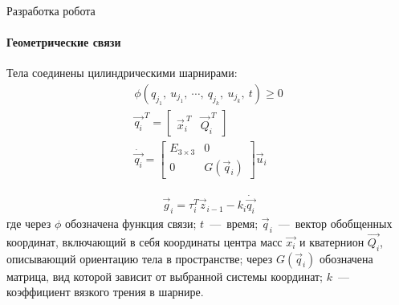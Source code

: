 \documentclass[aspectratio=169,xcolor=table,10pt]{beamer}
\begin{document}
\begin{frame}[t]{Разработка робота}
    \framesubtitle{Геометрические связи}
    \vspace{-0.5cm}
    Тела соединены цилиндрическими шарнирами:
    \begin{align*}
        \label{eq:kin_constr}
        \phi(q_{j_1},\ u_{j_1},\ \cdots,\ q_{j_k},\ u_{j_k},\ t) \geqslant  0 \\
        \vec{q_i}^{\ T} = \begin{bmatrix}
                              \vec{x}_i^{\ T} & \vec{Q}_i^{\ T}
                          \end{bmatrix}                   \\
        \dot{\vec{q_i}} = \begin{bmatrix}
                              E_{3\times3} & 0            \\
                              0            & G(\vec{q}_i)
                          \end{bmatrix}\vec{u}_i
    \end{align*}

    \begin{align*}
        \vec{g}_i = \tau_i^T \vec{z}_{i-1} -k_i \dot{\vec{q_i}}
    \end{align*}
    где через $\phi$ обозначена функция связи; $t$~---~время; $\vec{q}_{i}$~---~вектор обобщенных координат, включающий в себя координаты центра масс $\vec{x_i}$ и кватернион $\vec{Q_i}$, описывающий ориентацию тела в пространстве; через $G(\vec{q}_i)$ обозначена матрица, вид которой зависит от выбранной системы координат; $k$~---~ коэффициент вязкого трения в шарнире.
\end{frame}
\end{document}
